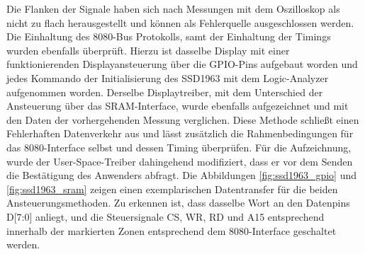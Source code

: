 Die Flanken der Signale haben sich nach Messungen mit dem Oszilloskop als nicht zu flach herausgestellt und können als Fehlerquelle ausgeschlossen werden. Die Einhaltung des 8080-Bus Protokolls, samt der Einhaltung der Timings wurden ebenfalls überprüft. Hierzu ist dasselbe Display mit einer funktionierenden Displayansteuerung über die GPIO-Pins aufgebaut worden und jedes Kommando der Initialisierung des SSD1963 mit dem Logic-Analyzer aufgenommen worden. Derselbe Displaytreiber, mit dem Unterschied der Ansteuerung über das SRAM-Interface, wurde ebenfalls aufgezeichnet und mit den Daten der vorhergehenden Messung verglichen. Diese Methode schließt einen Fehlerhaften Datenverkehr aus und lässt zusätzlich die Rahmenbedingungen für das 8080-Interface selbst und dessen Timing überprüfen. Für die Aufzeichnung, wurde der User-Space-Treiber dahingehend modifiziert, dass er vor dem Senden die Bestätigung des Anwenders abfragt. Die Abbildungen \ref{fig:ssd1963_gpio} und \ref{fig:ssd1963_sram} zeigen einen exemplarischen Datentransfer für die beiden Ansteuerungsmethoden. Zu erkennen ist, dass dasselbe Wort an den Datenpins D[7:0] anliegt, und die Steuersignale CS, WR, RD und A15 entsprechend innerhalb der markierten Zonen entsprechend dem 8080-Interface geschaltet werden. 

